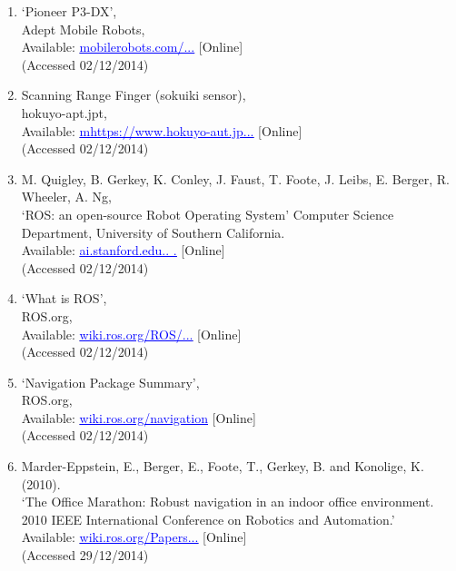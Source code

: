 \documentclass{article}
\begin{document}
\begin{enumerate}
\item ‘Pioneer P3-DX’,
\\Adept Mobile Robots,
\\Available: \href{mobilerobots.com/ResearchRobots/PioneerP3DX.aspx}{\textcolor{blue}{\uline{mobilerobots.com/...}}} [Online]
\\(Accessed 02/12/2014)

\item Scanning Range Finger (sokuiki sensor),
\\hokuyo-apt.jpt,
\\Available: \href{https://www.hokuyo-aut.jp/02sensor/07scanner/urg_04lx.html}{\textcolor{blue}{\uline{mhttps://www.hokuyo-aut.jp...}}} [Online]
\\(Accessed 02/12/2014)

\item M. Quigley, B. Gerkey, K. Conley, J. Faust, T. Foote, J. Leibs, E. Berger, R. Wheeler, A. Ng,
\\‘ROS: an open-source Robot Operating System’ Computer Science Department, University of Southern California. 
\\Available: \href{ai.stanford.edu/~ang/papers/icraoss09-ROS.pdf}{\textcolor{blue}{\uline{ai.stanford.edu.. .}}} [Online]
\\(Accessed 02/12/2014)

\item ‘What is ROS’,
\\ROS.org,
\\Available: \href{wiki.ros.org/ROS/Introduction}{\textcolor{blue}{\uline{wiki.ros.org/ROS/...}}} [Online]
\\(Accessed 02/12/2014)

\item ‘Navigation Package Summary’,
\\ROS.org,
\\Available: \href{wiki.ros.org/navigation}{\textcolor{blue}{\uline{wiki.ros.org/navigation}}} [Online]
\\(Accessed 02/12/2014)

\item Marder-Eppstein, E., Berger, E., Foote, T., Gerkey, B. and Konolige, K. (2010).
\\‘The Office Marathon: Robust navigation in an indoor office environment. 2010 IEEE International Conference on Robotics and Automation.’
\\Available: \href{wiki.ros.org/Papers/ICRA2010_Marder-Eppstein?action=AttachFile&do=view&target=icra2010_marder-eppstein.pdf}{\textcolor{blue}{\uline{wiki.ros.org/Papers...}}} [Online]
\\(Accessed 29/12/2014)


\end{enumerate}
\end{document}
